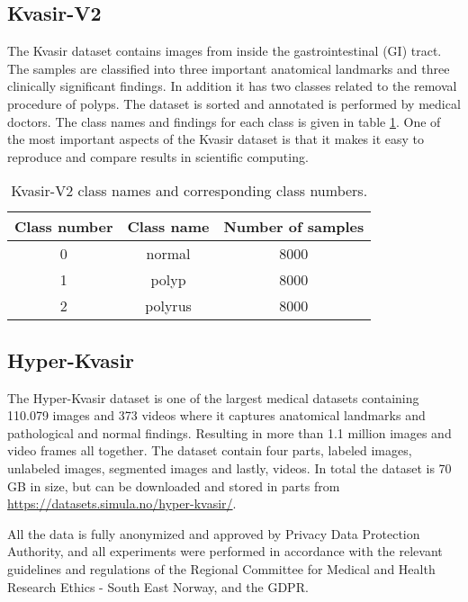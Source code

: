 \documentclass[thesis.tex]{subfiles}
\begin{document}
\subsection{Kvasir-V2} \label{sec:kvasir-v2}
The Kvasir dataset \cite{KVASIRMultiClass17} contains images from inside the gastrointestinal (GI) tract. The samples are classified into three important anatomical landmarks and three clinically significant findings. In addition it has two classes related to the removal procedure of polyps. The dataset is sorted and annotated is performed by medical doctors. The class names and findings for each class is given in table \ref{table:kvasir}. One of the most important aspects of the Kvasir dataset is that it makes it easy to reproduce and compare results in scientific computing.


\begin{table}
  \centering
  \begin{tabular}{ |c|c|c| }
  	\hline
  	Class number & Class name & Number of samples \\
    \hline
    0 & normal & 8000 \\ 
    1 & polyp & 8000 \\ 
    2 & polyrus & 8000 \\ 
    \hline
  \end{tabular}
  \caption{Kvasir-V2 class names and corresponding class numbers.}
  \label{table:kvasir}
\end{table}


\subsection{Hyper-Kvasir} \label{sec:hyper_kvasir}
The Hyper-Kvasir dataset \cite{HyperKvasirComprehensive19} is one of the largest medical datasets containing 110.079 images and 373 videos where it captures anatomical landmarks and pathological and normal findings. Resulting in more than 1.1 million images and video frames all together. The dataset contain four parts, labeled images, unlabeled images, segmented images and lastly, videos. In total the dataset is 70 GB in size, but can be downloaded and stored in parts from \url{https://datasets.simula.no/hyper-kvasir/}.

All the data is fully anonymized and approved by Privacy Data Protection Authority, and all experiments were performed in accordance with the relevant guidelines and regulations of the Regional Committee for Medical and Health Research Ethics - South East Norway, and the GDPR.
\end{document}
